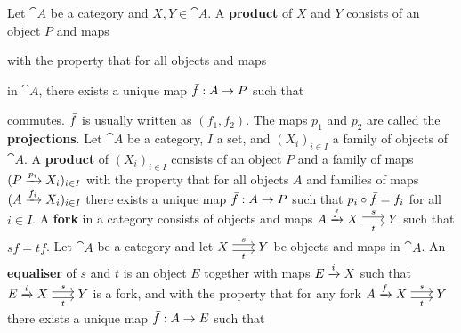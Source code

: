  Let $\cat A$ be a category and $X, Y \in \cat A$. A \textbf{product} of $X$ and $Y$ consists of an object $P$ and maps 
with the property that for all objects and maps 
in $\cat{A}$, there exists a unique map $\Bar{f}: A \to P$ such that %
commutes. $\Bar{f}$ is usually written as $(f_1, f_2)$. The maps $p_1$ and $p_2$ are called the \textbf{projections}.
 Let $\cat{A}$ be a category, $I$ a set, and $(X_i)_{i \in I}$ a family of objects of $\cat A$. A \textbf{product} of $(X_i)_{i \in I}$ consists of an object $P$ and a family of maps $(P \xrightarrow[]{p_i} X_i)_{i \in I}$ with the property that for all objects $A$ and families of maps $(A \xrightarrow[]{f_i} X_i)_{i \in I}$ there exists a unique map $\Bar{f}: A \to P$ such that $p_i \circ \Bar{f} = f_i$ for all $i \in I$.
 A \textbf{fork} in a category consists of objects and maps $A \map{f} X \maps{s}{t} Y$ such that $sf = tf$.
 Let $\cat A$ be a category and let $X \maps{s}{t} Y$ be objects and maps in $\cat A$. An \textbf{equaliser} of $s$ and $t$ is an object $E$ together with maps $E \xrightarrow[]{i} X$ such that $E \map{i} X \maps{s}{t} Y$ is a fork, and with the property that for any fork $A \map{f} X \maps{s}{t} Y$ there exists a unique map $\Bar{f}: A \to E$ such that %
